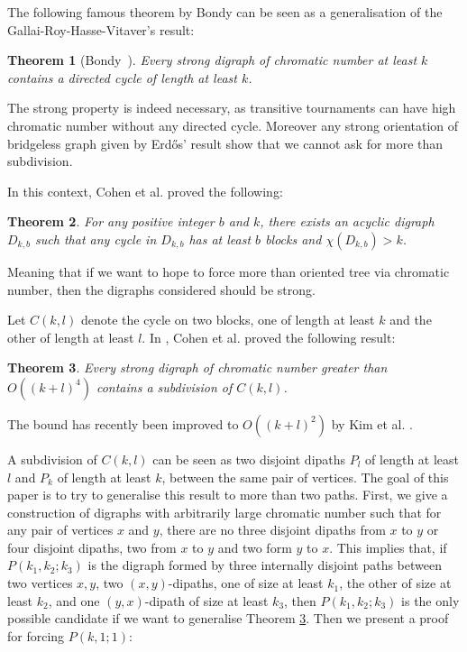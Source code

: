 \documentclass[utf8,10pt]{article}
\theoremstyle{plain}
\newtheorem{theorem}{Theorem}
\theoremstyle{definition}
\theoremstyle{remark}
\begin{document}
The following famous theorem by Bondy can be seen as a generalisation of the Gallai-Roy-Hasse-Vitaver's result: 

\begin{theorem}[Bondy~\cite{Bon76}]\label{thm:bondy}
Every strong digraph of chromatic number at least $k$ contains a directed cycle of length at least $k$.
\end{theorem} 

The strong property is indeed necessary, as transitive tournaments can have high chromatic number without any directed cycle. 
Moreover any strong orientation of bridgeless graph given by Erd\H{o}s' result show that we cannot ask for more than subdivision.  

In this context, \cite{CHLN16} Cohen et al. proved the following:

\begin{theorem}\label{dkb}
For any positive integer $b$ and $k$, there exists an acyclic digraph $D_{k,b}$ such that any cycle in $D_{k,b}$ has at least $b$ blocks and $\chi(D_{k,b}) > k$.
\end{theorem}

Meaning that if we want to hope to force more than oriented tree via chromatic number, then the digraphs considered should be strong. 

Let $C(k,l)$ denote the cycle on two blocks, one of length at least $k$ and the other of length at least $l$.
In \cite{CHLN16}, Cohen et al. proved the following result:
\begin{theorem}\label{th:ckl}
Every strong digraph of chromatic number greater than $O((k+l)^4)$ contains a subdivision of $C(k,l)$.
\end{theorem} 
The bound has recently been improved to $O((k+l)^2)$  by Kim et al. \cite{KKPM}.  

A subdivision of $C(k,l)$ can be seen as two disjoint dipaths $P_l$ of length at least $l$ and $P_k$ of length at least $k$,
between the same pair of vertices. The goal of this paper is to try to generalise this result to more than two paths.  
First, we give a construction of digraphs with arbitrarily large chromatic number such that for any pair of vertices
$x$ and $y$, there are no three disjoint dipaths from $x$ to $y$ or four disjoint dipaths, two from $x$ to $y$ and two form $y$ to $x$. 
This implies that, if $P(k_1,k_2;k_3)$ is the digraph formed by three internally disjoint paths between two vertices $x,y$,
two $(x,y)$-dipaths, one of size at least $k_1$, the other of size at least $k_2$, and one $(y,x)$-dipath of size at least $k_3$,
then $P(k_1,k_2;k_3)$ is the only possible candidate if we want to generalise Theorem \ref{th:ckl}.
Then we present a proof for forcing $P(k,1;1)$:
\end{document}
